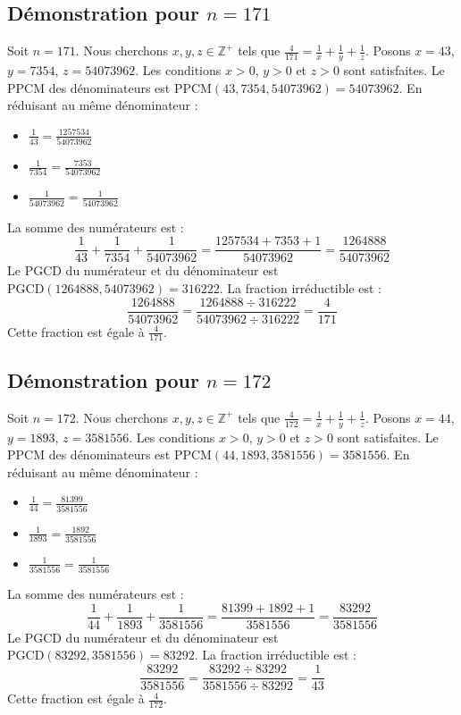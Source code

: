 \documentclass[11pt,a4paper]{article}
\begin{document}
\subsection{Démonstration pour $n = 171$}
Soit $n = 171$. Nous cherchons $x, y, z \in \mathbb{Z}^{+}$ tels que $\frac{4}{171} = \frac{1}{x} + \frac{1}{y} + \frac{1}{z}$.
Posons $x = 43$, $y = 7354$, $z = 54073962$.
Les conditions $x > 0$, $y > 0$ et $z > 0$ sont satisfaites.
Le PPCM des dénominateurs est $\text{PPCM}(43, 7354, 54073962) = 54073962$.
En réduisant au même dénominateur :
\begin{itemize}
    \item $\frac{1}{43} = \frac{1257534}{54073962}$
    \item $\frac{1}{7354} = \frac{7353}{54073962}$
    \item $\frac{1}{54073962} = \frac{1}{54073962}$
\end{itemize}
La somme des numérateurs est :
$$ \frac{1}{43} + \frac{1}{7354} + \frac{1}{54073962} = \frac{1257534 + 7353 + 1}{54073962} = \frac{1264888}{54073962} $$
Le PGCD du numérateur et du dénominateur est $\text{PGCD}(1264888, 54073962) = 316222$.
La fraction irréductible est :
$$ \frac{1264888}{54073962} = \frac{1264888 \div 316222}{54073962 \div 316222} = \frac{4}{171} $$
Cette fraction est égale à $\frac{4}{171}$.

\subsection{Démonstration pour $n = 172$}
Soit $n = 172$. Nous cherchons $x, y, z \in \mathbb{Z}^{+}$ tels que $\frac{4}{172} = \frac{1}{x} + \frac{1}{y} + \frac{1}{z}$.
Posons $x = 44$, $y = 1893$, $z = 3581556$.
Les conditions $x > 0$, $y > 0$ et $z > 0$ sont satisfaites.
Le PPCM des dénominateurs est $\text{PPCM}(44, 1893, 3581556) = 3581556$.
En réduisant au même dénominateur :
\begin{itemize}
    \item $\frac{1}{44} = \frac{81399}{3581556}$
    \item $\frac{1}{1893} = \frac{1892}{3581556}$
    \item $\frac{1}{3581556} = \frac{1}{3581556}$
\end{itemize}
La somme des numérateurs est :
$$ \frac{1}{44} + \frac{1}{1893} + \frac{1}{3581556} = \frac{81399 + 1892 + 1}{3581556} = \frac{83292}{3581556} $$
Le PGCD du numérateur et du dénominateur est $\text{PGCD}(83292, 3581556) = 83292$.
La fraction irréductible est :
$$ \frac{83292}{3581556} = \frac{83292 \div 83292}{3581556 \div 83292} = \frac{1}{43} $$
Cette fraction est égale à $\frac{4}{172}$.
\end{document}

